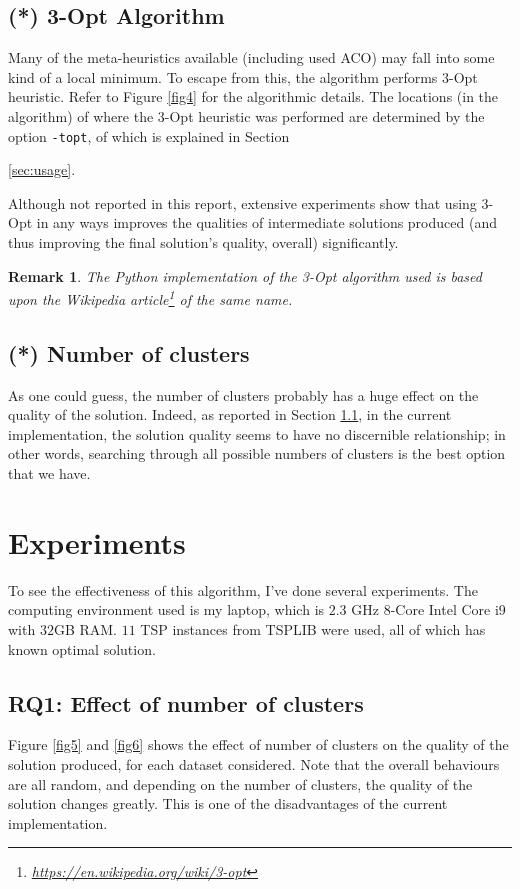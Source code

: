 \documentclass[a4paper]{article}
\newtheorem*{remark}{Remark}
\begin{document}
\subsection{(*) 3-Opt Algorithm}
Many of the meta-heuristics available (including used ACO) may fall into some kind of a local minimum.
To escape from this, the algorithm performs 3-Opt heuristic.
Refer to Figure \ref{fig4} for the algorithmic details.
The locations (in the algorithm) of where the 3-Opt heuristic was performed are determined by the option \texttt{-topt}, of which is explained in Section {\ref{sec:usage}.

Although not reported in this report, extensive experiments show that using 3-Opt in any ways improves the qualities of intermediate solutions produced (and thus improving the final solution's quality, overall) significantly.

\begin{remark}
	The Python implementation of the 3-Opt algorithm used is based upon the Wikipedia article\footnote{\hyperlink{https://en.wikipedia.org/wiki/3-opt}{https://en.wikipedia.org/wiki/3-opt}} of the same name.
\end{remark}


\subsection{(*) Number of clusters}
As one could guess, the number of clusters probably has a huge effect on the quality of the solution.
Indeed, as reported in Section \ref{subsec:rq1}, in the current implementation, the solution quality seems to have no discernible relationship; in other words, searching through all possible numbers of clusters is the best option that we have.


\section{Experiments}
To see the effectiveness of this algorithm, I've done several experiments.
The computing environment used is my laptop, which is $2.3$ GHz $8$-Core Intel Core i9 with $32$GB RAM.
$11$ TSP instances from TSPLIB\cite{Rei91} were used, all of which has known optimal solution.

\subsection{RQ1: Effect of number of clusters}
\label{subsec:rq1}
Figure \ref{fig5} and \ref{fig6} shows the effect of number of clusters on the quality of the solution produced, for each dataset considered.
Note that the overall behaviours are all random, and depending on the number of clusters, the quality of the solution changes greatly.
This is one of the disadvantages of the current implementation.

}
\end{document}

